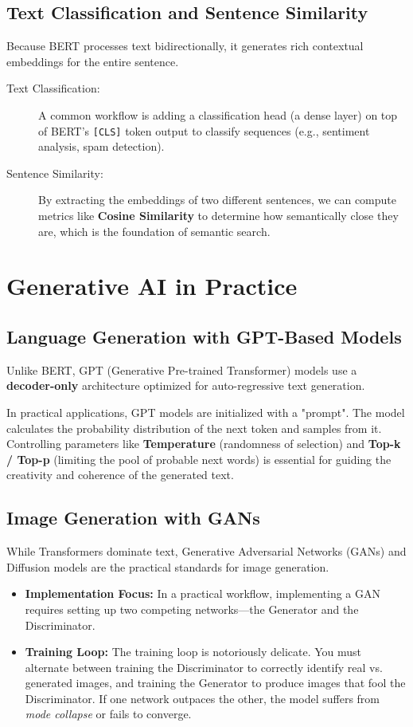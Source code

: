 \subsection*{Text Classification and Sentence Similarity}
Because BERT processes text bidirectionally, it generates rich contextual embeddings for the entire sentence.
\begin{description}
    \item[Text Classification:] A common workflow is adding a classification head (a dense layer) on top of BERT's \texttt{[CLS]} token output to classify sequences (e.g., sentiment analysis, spam detection).
    \item[Sentence Similarity:] By extracting the embeddings of two different sentences, we can compute metrics like \textbf{Cosine Similarity} to determine how semantically close they are, which is the foundation of semantic search.
\end{description}

\section*{Generative AI in Practice}

\subsection*{Language Generation with GPT-Based Models}
Unlike BERT, GPT (Generative Pre-trained Transformer) models use a \textbf{decoder-only} architecture optimized for auto-regressive text generation.

\begin{remark}
In practical applications, GPT models are initialized with a "prompt". The model calculates the probability distribution of the next token and samples from it. Controlling parameters like \textbf{Temperature} (randomness of selection) and \textbf{Top-k / Top-p} (limiting the pool of probable next words) is essential for guiding the creativity and coherence of the generated text.
\end{remark}

\subsection*{Image Generation with GANs}
While Transformers dominate text, Generative Adversarial Networks (GANs) and Diffusion models are the practical standards for image generation.
\begin{itemize}
    \item \textbf{Implementation Focus:} In a practical workflow, implementing a GAN requires setting up two competing networks—the Generator and the Discriminator.
    \item \textbf{Training Loop:} The training loop is notoriously delicate. You must alternate between training the Discriminator to correctly identify real vs. generated images, and training the Generator to produce images that fool the Discriminator. If one network outpaces the other, the model suffers from \textit{mode collapse} or fails to converge.
\end{itemize}

